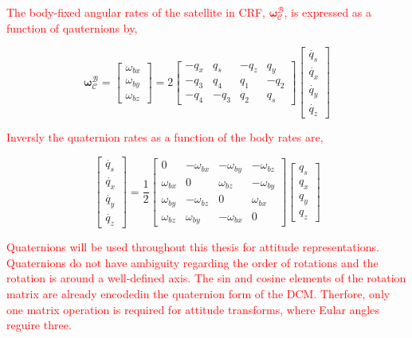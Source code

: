 \textcolor{red}{The body-fixed angular rates of the satellite in CRF, $\mathbf{\omega}_{\mathcal{C}}^{\mathcal{B}}$, is expressed as a function of qauternions by,}

\begin{equation}
    \mathbf{\omega}_{\mathcal{C}}^{\mathcal{B}} = 
    \begin{bmatrix}
        \omega_{bx} \\ \omega_{by} \\ \omega_{bz}
    \end{bmatrix}
    = 2
    \begin{bmatrix}
       -q_x & q_s & -q_z & q_y \\
       -q_3 & q_4 & q_1 & -q_2 \\
       -q_4 & -q_3 & q_2 & q_s 
    \end{bmatrix}
    \begin{bmatrix}
        \dot{q_s} \\ \dot{q_x} \\ \dot{q_y} \\ \dot{q_z}
    \end{bmatrix}
\end{equation}

\textcolor{red}{Inversly the quaternion rates as a function of the body rates are,}

\begin{equation}
    \begin{bmatrix}
        \dot{q_s} \\ \dot{q_x} \\ \dot{q_y} \\ \dot{q_z}
    \end{bmatrix}
    =
    \frac{1}{2}
    \begin{bmatrix}
        0 & -\omega_{bx} & -\omega_{by} & -\omega_{bz}\\
        \omega_{bx} & 0 & \omega_{bz} & -\omega_{by}\\
        \omega_{by} & -\omega_{bz} & 0 & \omega_{bx}\\
        \omega_{bz} & \omega_{by} & -\omega_{bx} & 0 
    \end{bmatrix}
    \begin{bmatrix}
        q_s \\ q_x \\ q_y \\ q_z
    \end{bmatrix}
\end{equation}

\textcolor{red}{Quaternions will be used throughout this thesis for attitude representations. Quaternions do not have ambiguity regarding the order of rotations
and the rotation is around a well-defined axis. The sin and cosine elements of the rotation matrix are already encodedin the quaternion form of the DCM. Therfore,
only one matrix operation is required for attitude transforms, where Eular angles reguire three.}

